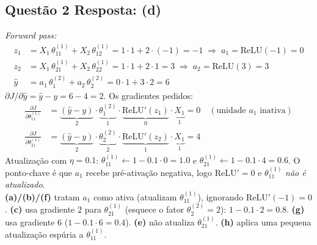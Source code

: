 \documentclass[11pt,a4paper]{article}
\begin{document}
\subsection*{Questão 2 \textemdash{} Resposta: (d)}
\textit{Forward pass:}
\begin{align*}
    z_1 &= X_1\,\theta^{(1)}_{11} + X_2\,\theta^{(1)}_{12} = 1\cdot 1 + 2\cdot(-1) = -1 \;\Rightarrow\; a_1 = \mathrm{ReLU}(-1) = 0 \\
    z_2 &= X_1\,\theta^{(1)}_{21} + X_2\,\theta^{(1)}_{22} = 1\cdot 1 + 2\cdot 1 = 3 \;\Rightarrow\; a_2 = \mathrm{ReLU}(3) = 3 \\
    \hat{y} &= a_1\,\theta^{(2)}_{1} + a_2\,\theta^{(2)}_{2} = 0\cdot 1 + 3\cdot 2 = 6
\end{align*}
$\partial J/\partial \hat{y} = \hat{y} - y = 6 - 4 = 2$. Os gradientes pedidos:
\begin{align*}
    \frac{\partial J}{\partial \theta^{(1)}_{11}} &= \underbrace{(\hat{y}-y)}_{2}\cdot \underbrace{\theta^{(2)}_{1}}_{1}\cdot \underbrace{\mathrm{ReLU}'(z_1)}_{0}\cdot \underbrace{X_1}_{1} = 0 \quad (\text{unidade } a_1 \text{ inativa}) \\
    \frac{\partial J}{\partial \theta^{(1)}_{21}} &= \underbrace{(\hat{y}-y)}_{2}\cdot \underbrace{\theta^{(2)}_{2}}_{2}\cdot \underbrace{\mathrm{ReLU}'(z_2)}_{1}\cdot \underbrace{X_1}_{1} = 4
\end{align*}
Atualização com $\eta = 0.1$: $\theta^{(1)}_{11} \leftarrow 1 - 0.1\cdot 0 = 1.0$ e $\theta^{(1)}_{21} \leftarrow 1 - 0.1\cdot 4 = 0.6$. O ponto-chave é que $a_1$ recebe pré-ativação negativa, logo $\mathrm{ReLU}' = 0$ e $\theta^{(1)}_{11}$ \emph{não é atualizado}.\\
\textbf{(a)/(b)/(f)} tratam $a_1$ como ativa (atualizam $\theta^{(1)}_{11}$), ignorando $\mathrm{ReLU}'(-1) = 0$.
\textbf{(c)} usa gradiente $2$ para $\theta^{(1)}_{21}$ (esquece o fator $\theta^{(2)}_2 = 2$): $1 - 0.1\cdot 2 = 0.8$.
\textbf{(g)} usa gradiente $6$ ($1 - 0.1\cdot 6 = 0.4$).
\textbf{(e)} não atualiza $\theta^{(1)}_{21}$.
\textbf{(h)} aplica uma pequena atualização espúria a $\theta^{(1)}_{11}$.
\end{document}
